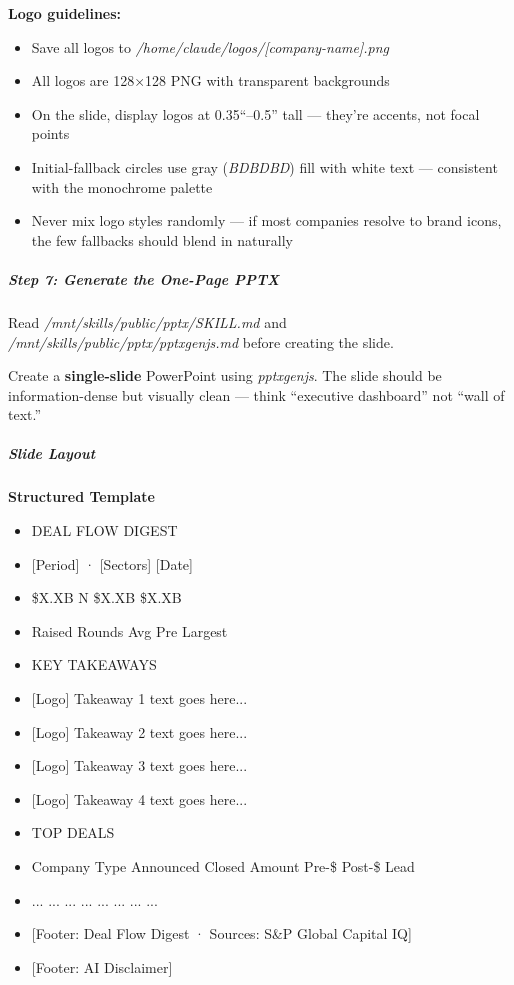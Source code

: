 \documentclass[11pt]{article}
\begin{document}
\textbf{Logo guidelines:}

\begin{itemize}[leftmargin=*,itemsep=2pt,topsep=2pt]
\item {} Save all logos to \emph{/home/claude/logos/[company-name].png}
\item {} All logos are 128×128 PNG with transparent backgrounds
\item {} On the slide, display logos at 0.35``–0.5'' tall — they're accents, not focal points
\item {} Initial-fallback circles use gray (\emph{BDBDBD}) fill with white text — consistent with the monochrome palette
\item {} Never mix logo styles randomly — if most companies resolve to brand icons, the few fallbacks should blend in naturally
\end{itemize}

\subparagraph{Step 7: Generate the One-Page PPTX}\mbox{}\par

Read \emph{/mnt/skills/public/pptx/SKILL.md} and \emph{/mnt/skills/public/pptx/pptxgenjs.md} before creating the slide.


Create a \textbf{single-slide} PowerPoint using \emph{pptxgenjs}. The slide should be information-dense but visually clean — think ``executive dashboard'' not ``wall of text.''


\subparagraph{Slide Layout}\mbox{}\par

\textbf{Structured Template}
\begin{itemize}[leftmargin=*,itemsep=2pt,topsep=2pt]
\item {} DEAL FLOW DIGEST
\item {} [Period] · [Sectors] [Date]
\item {} \$X.XB N \$X.XB \$X.XB
\item {} Raised Rounds Avg Pre Largest
\item {} KEY TAKEAWAYS
\item {} [Logo] Takeaway 1 text goes here...
\item {} [Logo] Takeaway 2 text goes here...
\item {} [Logo] Takeaway 3 text goes here...
\item {} [Logo] Takeaway 4 text goes here...
\item {} TOP DEALS
\item {} Company Type Announced Closed Amount Pre-\$ Post-\$ Lead 🔗
\item {} ... ... ... ... ... ... ... ... 🔗
\item {} [Footer: Deal Flow Digest · Sources: S\&P Global Capital IQ]
\item {} [Footer: AI Disclaimer]
\end{itemize}
\end{document}
